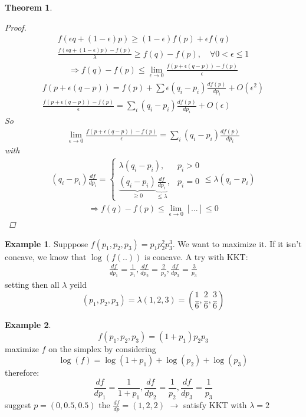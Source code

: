 \documentclass{article}
\newtheorem{theorem}{Theorem}[section]
\theoremstyle{definition} %
\newtheorem{example}{Example}
\begin{document}
\begin{appendices}
\begin{theorem}
  \begin{proof}
    \begin{align*}
      f(\epsilon q + (1 - \epsilon)p) \geq (1 - \epsilon) f(p) + \epsilon f(q) \\
      \frac{f(\epsilon q + (1 - \epsilon)p) - f(p)}{\lambda} \geq f(q) - f(p), \quad \forall 0 < \epsilon \leq 1
    \end{align*}
    \begin{align*}
      \Rightarrow f(q) - f(p) \leq \lim_{\epsilon \to 0} \frac{f(p + \epsilon(q - p)) - f(p)}{\epsilon}
    \end{align*}
    \begin{align*}
      f(p + \epsilon (q - p)) = f(p) + \sum \epsilon(q_i - p_i) \frac{df(p)}{dp_i} + O(\epsilon^2) \\
      \frac{f(p + \epsilon(q - p)) - f(p)}{\epsilon} = \sum_{i} (q_i - p_i) \frac{d f(p)}{d p_i} + O(\epsilon)
    \end{align*}
    So
    \begin{align*}
      \lim_{\epsilon \to 0} \frac{f(p + \epsilon(q - p)) - f(p)}{\epsilon} = \sum_i (q_i - p_i) \frac{d f(p)}{d p_i}
    \end{align*}
    with
    \begin{align*}
      (q_i - p_i) \frac{df}{dp_i} =
      \left\{
      \begin{array}{ll}
        \lambda (q_i - p_i), & p_i > 0 \\
        \underbrace{(q_i - p_i)}_{\geq 0} \underbrace{\frac{df}{dp_i}}_{\leq \lambda}, & p_i = 0
      \end{array}
      \right.
      \leq \lambda (q_i - p_i)
    \end{align*}
    \begin{align*}
      \Rightarrow f(q) - f(p) \leq \lim_{\epsilon \to 0} [...] \leq 0
    \end{align*}
  \end{proof}
\end{theorem}

\begin{example}
  Supppose $f(p_1, p_2, p_3) = p_1 p_2^2 p_3^3$.
  We want to maximize it. If it isn't concave, we know that $\log(f(..))$ is concave. A try with KKT:
  \begin{align*}
    \frac{df}{dp_1} = \frac{1}{p_1}, \frac{df}{dp_2} = \frac{2}{p_2}, \frac{df}{dp_3} = \frac{3}{p_3}
  \end{align*}
  setting then all $\lambda$ yeild
  \[ (p_1, p_2, p_3) = \lambda (1, 2, 3) = ( \frac{1}{6}, \frac{2}{6}, \frac{3}{6}) \]
\end{example}

\begin{example}
  \[f(p_1, p_2, p_3) = (1 + p_1) p_2 p_3 \]
  maximize $f$ on the simplex by considering
  \[ \log(f) = \log(1 + p_1) + \log(p_2) + \log(p_3) \]
  therefore:
  \[
    \frac{df}{dp_1} = \frac{1}{1 + p_1}, \frac{df}{dp_2} = \frac{1}{p_2}, \frac{df}{dp_3} = \frac{1}{p_3}
  \]
  suggest $p = (0, 0.5, 0.5)$ the $\frac{df}{dp} = (1, 2, 2)$
  $\rightarrow$ satisfy KKT with $\lambda = 2$
\end{example}
\end{appendices}
\end{document}

